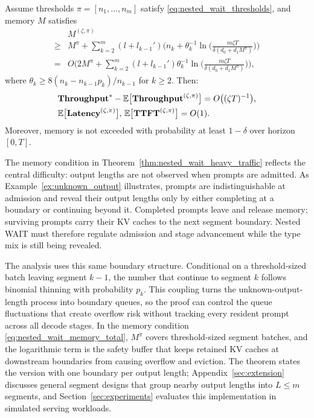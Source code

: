 \begin{theorem}
\label{thm:nested_wait_heavy_traffic}
Assume thresholds \( \pi = [n_1, \dots, n_m] \) satisfy \eqref{eq:nested_wait_thresholds}, and memory \( M \) satisfies
\begin{equation}
    \label{eq:nested_wait_memory_total}
\begin{aligned}
    &M^{(\zeta,\pi)}\\
\geq &M^\pi + \sum_{k=2}^m (l + l_{k-1}') \bigg(n_k + \theta_k^{-1} \ln\Big( \frac{m \zeta T}{\delta(d_0+d_1M^\pi)} \Big)\bigg) \\
=& O\bigg( 2M^\pi + \sum_{k=2}^m (l + l_{k-1}') \theta_k^{-1}\ln\Big( \frac{m \zeta T}{\delta(d_0+d_1M^\pi)} \Big) \bigg),
\end{aligned}
\end{equation}
where $\theta_k \geq 8(n_k - n_{k-1}p_k)/n_{k-1}$ for \(k\ge 2\). Then:
$$
    \begin{aligned}
        &\textbf{Throughput}^* - \mathbb{E}\big[ \textbf{Throughput}^{(\zeta, \pi)} \big] 
   = O\big( (\zeta T)^{-1} \big), \\
&\mathbb{E}\big[ \textbf{Latency}^{(\zeta, \pi)} \big],\,\mathbb{E}\big[ \textbf{TTFT}^{(\zeta, \pi)} \big] = O(1).
    \end{aligned}
$$
Moreover, memory is not exceeded with probability at least \(1-\delta\) over horizon \([0,T]\).
\end{theorem}

The memory condition in Theorem~\ref{thm:nested_wait_heavy_traffic} reflects the central difficulty: output lengths are not observed when prompts are admitted. As Example~\ref{ex:unknown_output} illustrates, prompts are indistinguishable at admission and reveal their output lengths only by either completing at a boundary or continuing beyond it. Completed prompts leave and release memory; surviving prompts carry their KV caches to the next segment boundary. Nested WAIT must therefore regulate admission and stage advancement while the type mix is still being revealed.

The analysis uses this same boundary structure. Conditional on a threshold-sized batch leaving segment \(k-1\), the number that continue to segment \(k\) follows binomial thinning with probability \(p_k\). This coupling turns the unknown-output-length process into boundary queues, so the proof can control the queue fluctuations that create overflow risk without tracking every resident prompt across all decode stages. In the memory condition \eqref{eq:nested_wait_memory_total}, \(M^\pi\) covers threshold-sized segment batches, and the logarithmic term is the safety buffer that keeps retained KV caches at downstream boundaries from causing overflow and eviction. The theorem states the version with one boundary per output length; Appendix~\ref{sec:extension} discusses general segment designs that group nearby output lengths into \(L\le m\) segments, and Section~\ref{sec:experiments} evaluates this implementation in simulated serving workloads.
